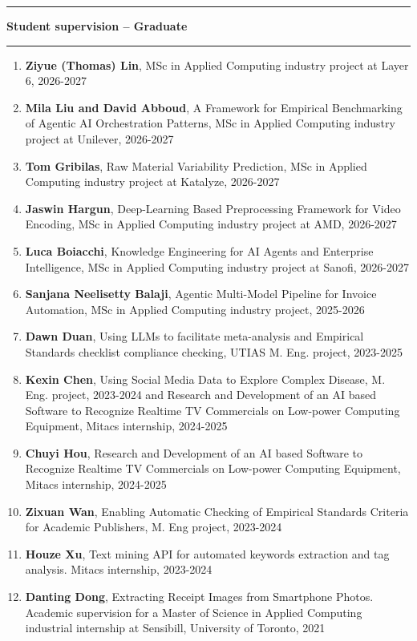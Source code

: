 \documentclass[letterpaper,11pt]{article}
\newcommand{\resheading}[1]{%
  \vspace{10pt}%
  \noindent\textcolor{accent}{\rule{3pt}{12pt}}\hspace{6pt}%
  {\large \textbf{\textcolor{accent}{#1}}}%
  \vspace{2pt}%
  \par\noindent\textcolor{accent!30}{\rule{\textwidth}{0.5pt}}%
  \vspace{2pt}%
}
\begin{document}
\resheading{Student supervision -- Graduate}

\begin{enumerate}

\item
	\textbf{Ziyue (Thomas) Lin}, MSc in Applied Computing industry project at Layer 6, 2026-2027
\item
	\textbf{Mila Liu and David Abboud}, A Framework for Empirical Benchmarking of Agentic AI Orchestration Patterns, MSc in Applied Computing industry project at Unilever, 2026-2027
\item
	\textbf{Tom Gribilas}, Raw Material Variability Prediction, MSc in Applied Computing industry project at Katalyze, 2026-2027
\item
	\textbf{Jaswin Hargun}, Deep-Learning Based Preprocessing Framework for Video Encoding, MSc in Applied Computing industry project at AMD, 2026-2027
\item
	\textbf{Luca Boiacchi}, Knowledge Engineering for AI Agents and Enterprise Intelligence, MSc in Applied Computing industry project at Sanofi, 2026-2027
\item
	\textbf{Sanjana Neelisetty Balaji}, Agentic Multi-Model Pipeline for Invoice Automation, MSc in Applied Computing industry project, 2025-2026
\item
	\textbf{Dawn Duan}, Using LLMs to facilitate meta-analysis and Empirical Standards checklist compliance checking, UTIAS M. Eng. project, 2023-2025
\item
	\textbf{Kexin Chen}, Using Social Media Data to Explore Complex Disease, M. Eng. project, 2023-2024 and Research and Development of an AI based Software to Recognize
Realtime TV Commercials on Low-power Computing Equipment, Mitacs internship, 2024-2025
\item 
        \textbf{Chuyi Hou}, Research and Development of an AI based Software to Recognize
Realtime TV Commercials on Low-power Computing Equipment, Mitacs internship, 2024-2025
\item
	\textbf{Zixuan Wan}, Enabling Automatic Checking of Empirical Standards Criteria for Academic Publishers, M. Eng project, 2023-2024
\item
	\textbf{Houze Xu}, Text mining API for automated keywords extraction and tag analysis. Mitacs internship, 2023-2024 
\item 
	\textbf{Danting Dong}, Extracting Receipt Images from Smartphone Photos.  Academic supervision for a Master of Science in Applied Computing industrial internship at Sensibill, University of Toronto, 2021 



\end{enumerate}
\end{document}
